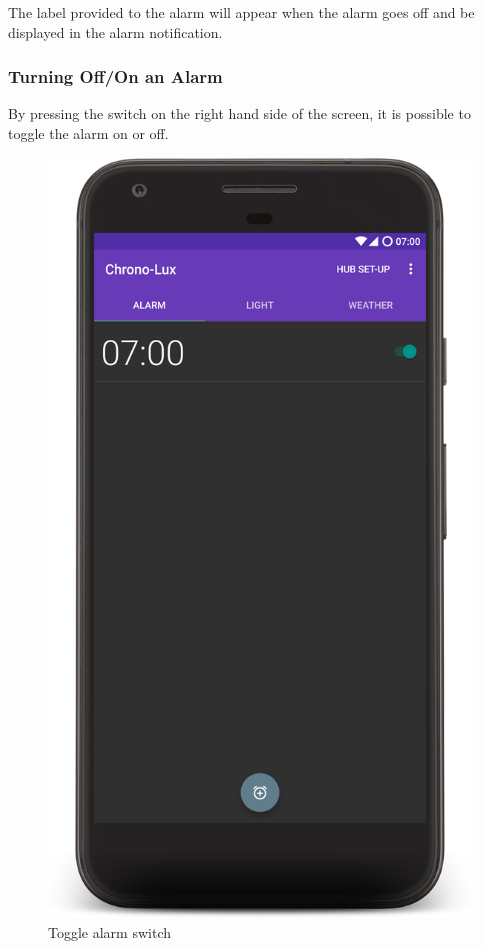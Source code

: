 The label provided to the alarm will appear when the alarm goes off and
be displayed in the alarm notification.

\subsubsection{Turning Off/On an Alarm}\label{turning-offon-an-alarm}

By pressing the switch on the right hand side of the screen, it is
possible to toggle the alarm on or off.

\begin{figure}[H]
  \centering
  \includegraphics[trim= 0 2000 0 0, clip, scale=0.1]{Images/addAlarm.png}
  \caption{Toggle alarm switch}
  \label{fig:toggleAlarm}
\end{figure}

